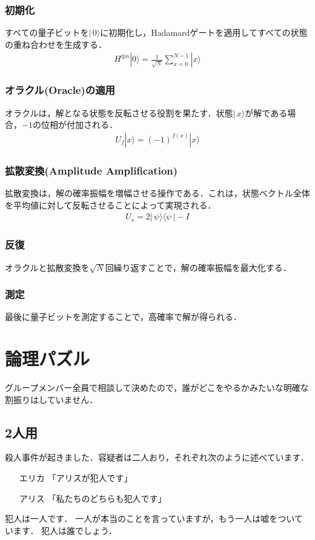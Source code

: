 \documentclass[titlepage,a4paper]{jsarticle}
\begin{document}
\subsubsection{初期化}
すべての量子ビットを$|\,0\rangle$に初期化し，Hadamardゲートを適用してすべての状態の重ね合わせを生成する．
\begin{align}
  H^{\otimes n}|0\rangle = \frac{1}{\sqrt{N}} \sum_{x=0}^{N-1} |x\rangle
\end{align}
\subsubsection{オラクル(Oracle)の適用}
オラクルは，解となる状態を反転させる役割を果たす．状態$|\,x\rangle$が解である場合，$-1$の位相が付加される．
\begin{align}
  U_f|x\rangle = (-1)^{f(x)}|x\rangle
\end{align}
\subsubsection{拡散変換(Amplitude Amplification)}
拡散変換は，解の確率振幅を増幅させる操作である．これは，状態ベクトル全体を平均値に対して反転させることによって実現される．
\begin{align}
  U_s = 2|\,\psi\rangle \langle \psi\,| - I
\end{align}
\subsubsection{反復}
オラクルと拡散変換を$\sqrt{N}$回繰り返すことで，解の確率振幅を最大化する．
\subsubsection{測定}
最後に量子ビットを測定することで，高確率で解が得られる．

\section{論理パズル}\label{パズル}
グループメンバー全員で相談して決めたので，誰がどこをやるかみたいな明確な割振りはしていません．
\subsection{2人用}
殺人事件が起きました．容疑者は二人おり，それぞれ次のように述べています．
\begin{itemize}
  \item [エリカ]「アリスが犯人です」
  \item [アリス]「私たちのどちらも犯人です」
\end{itemize}
犯人は一人です．
一人が本当のことを言っていますが，もう一人は嘘をついています．
犯人は誰でしょう．
\end{document}
